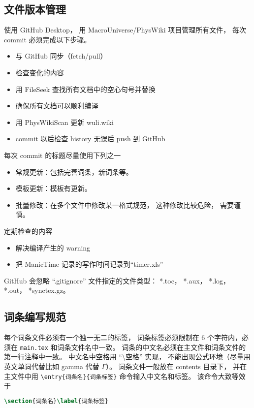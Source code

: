\subsection{文件版本管理}
使用 GitHub Desktop， 用 MacroUniverse/PhysWiki 项目管理所有文件， 每次 commit 必须完成以下步骤。
\begin{itemize}
\item 与 GitHub 同步（fetch/pull）
\item 检查变化的内容
\item 用 FileSeek 查找所有文档中的空心句号并替换
\item 确保所有文档可以顺利编译
\item 用 PhysWikiScan 更新 wuli.wiki
\item commit 以后检查 history 无误后 push 到 GitHub
\end{itemize}
每次 commit 的标题尽量使用下列之一
\begin{itemize}
\item 常规更新：包括完善词条，新词条等。
\item 模板更新：模板有更新。
\item 批量修改：在多个文件中修改某一格式规范， 这种修改比较危险， 需要谨慎。
\end{itemize}
定期检查的内容
\begin{itemize}
\item 解决编译产生的 warning
\item 把 ManicTime 记录的写作时间记录到“timer.xls”
\end{itemize}

GitHub 会忽略 “.gitignore” 文件指定的文件类型： *.toc， *.aux， *.log， *.out， *synctex.gz。

\subsection{词条编写规范}

每个词条文件必须有一个独一无二的标签， 词条标签必须限制在 6 个字符内，必须在 \verb|main.tex| 和词条文件名中一致。 词条的中文名必须在主文件和词条文件的第一行注释中一致。 中文名中空格用 “\textbackslash 空格” 实现， 不能出现公式环境（尽量用英文单词代替比如 gamma 代替 $\Gamma$）。 词条文件一般放在 contents 目录下， 并在主文件中用 \verb|\entry{词条名}{词条标签}| 命令输入中文名和标签。 该命令大致等效于

\begin{lstlisting}[language=latex]
\section{词条名}\label{词条标签}
\end{lstlisting}

